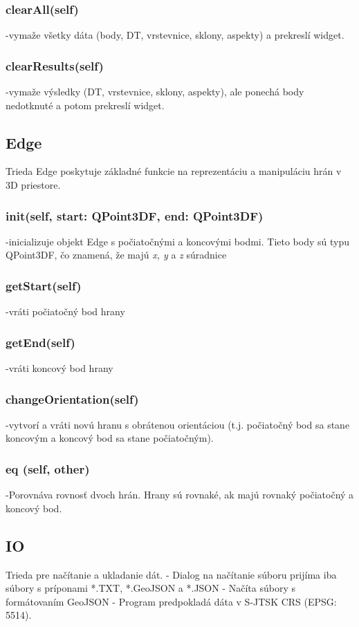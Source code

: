 \documentclass[12pt]{article}
\begin{document}
\subsubsection*{clearAll(self)}
\noindent-vymaže všetky dáta (body, DT, vrstevnice, sklony, aspekty) a prekreslí widget.
\subsubsection*{clearResults(self)}
\noindent-vymaže výsledky (DT, vrstevnice, sklony, aspekty), ale ponechá body nedotknuté a potom prekreslí widget.
\subsection*{Edge}
Trieda Edge poskytuje základné funkcie na reprezentáciu a manipuláciu hrán v 3D priestore.
\subsubsection*{\textunderscore\textunderscore init\textunderscore\textunderscore(self, start: QPoint3DF, end: QPoint3DF)}
\noindent-inicializuje objekt Edge s počiatočnými a koncovými bodmi. Tieto body sú typu QPoint3DF, čo znamená, že majú \textit{x, y} a \textit{z} súradnice
\subsubsection*{getStart(self)}
\noindent-vráti počiatočný bod hrany
\subsubsection*{getEnd(self)}
\noindent-vráti koncový bod hrany
\subsubsection*{changeOrientation(self)}
\noindent-vytvorí a vráti novú hranu s obrátenou orientáciou (t.j. počiatočný bod sa stane koncovým a koncový bod sa stane počiatočným).
\subsubsection*{\textunderscore\textunderscore  eq \textunderscore\textunderscore (self, other)}
\noindent-Porovnáva rovnosť dvoch hrán. Hrany sú rovnaké, ak majú rovnaký počiatočný a koncový bod.
\subsection*{IO}
Trieda pre načítanie a ukladanie dát. - Dialog na načítanie súboru prijíma iba súbory s príponami *.TXT, *.GeoJSON a *.JSON - Načíta súbory s formátovaním GeoJSON - Program predpokladá dáta v S-JTSK CRS (EPSG: 5514).
\end{document}
